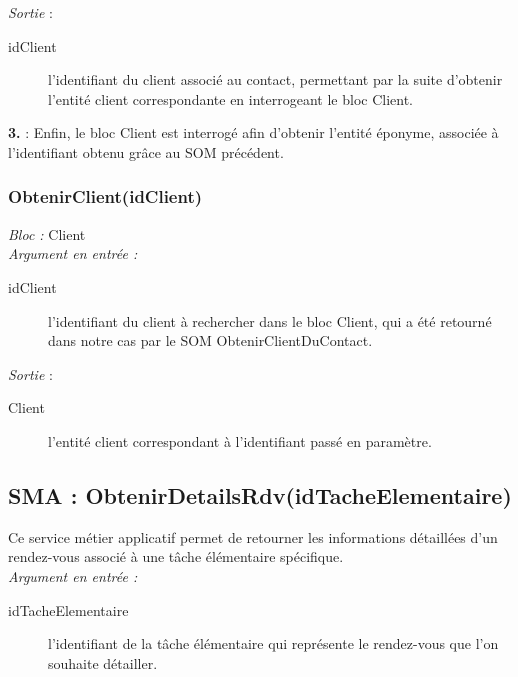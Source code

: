 \noindent \textit{Sortie} :
\begin{description}
\item[idClient] l'identifiant du client associé au contact, permettant par la suite d'obtenir l'entité client correspondante en interrogeant le bloc Client. \\
\end{description}

\begin{shaded}
\textbf{3.} : Enfin, le bloc Client est interrogé afin d'obtenir l'entité éponyme, associée à l'identifiant obtenu grâce au SOM précédent.
\end{shaded}

\subsubsection{ObtenirClient(idClient)}
\noindent \textit{Bloc : } Client \\

\noindent \textit{Argument en entrée :}
\begin{description}
\item[idClient] l'identifiant du client à rechercher dans le bloc Client, qui a été retourné dans notre cas par le SOM ObtenirClientDuContact. \\
\end{description}

\noindent \textit{Sortie} :
\begin{description}
\item[Client] l'entité client correspondant à l'identifiant passé en paramètre. \\
\end{description}

\subsection{SMA : ObtenirDetailsRdv(idTacheElementaire)} 

Ce service métier applicatif permet de retourner les informations détaillées d'un rendez-vous associé à une tâche élémentaire spécifique.\\

\noindent \textit{Argument en entrée :}
\begin{description}
\item[idTacheElementaire] l'identifiant de la tâche élémentaire qui représente le rendez-vous que l'on souhaite détailler. \\
\end{description}

